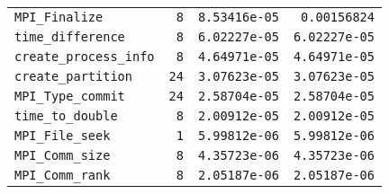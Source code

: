 \documentclass[a4paper,10pt]{article}
\begin{document}
\begin{center}
\begin{longtable}{|l||r|r|r|}
      \hline
  \verb|MPI_Finalize| &   \verb|8| &   \verb|8.53416e-05| &   \verb|0.00156824| \\
  \verb|time_difference| &   \verb|8| &   \verb|6.02227e-05| &   \verb|6.02227e-05| \\
  \verb|create_process_info| &   \verb|8| &   \verb|4.64971e-05| &   \verb|4.64971e-05| \\
      \hline
  \verb|create_partition| &   \verb|24| &   \verb|3.07623e-05| &   \verb|3.07623e-05| \\
  \verb|MPI_Type_commit| &   \verb|24| &   \verb|2.58704e-05| &   \verb|2.58704e-05| \\
  \verb|time_to_double| &   \verb|8| &   \verb|2.00912e-05| &   \verb|2.00912e-05| \\
      \hline
  \verb|MPI_File_seek| &   \verb|1| &   \verb|5.99812e-06| &   \verb|5.99812e-06| \\
  \verb|MPI_Comm_size| &   \verb|8| &   \verb|4.35723e-06| &   \verb|4.35723e-06| \\
  \verb|MPI_Comm_rank| &   \verb|8| &   \verb|2.05187e-06| &   \verb|2.05187e-06| \\
   \hline
\end{longtable}

\end{center}
\newpage
\end{document}

